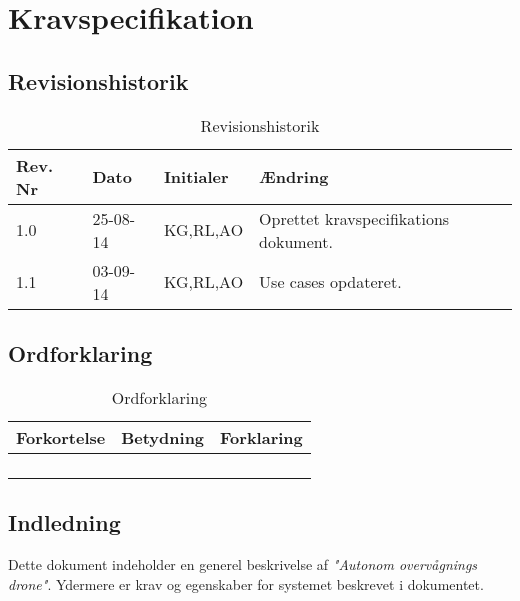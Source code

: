 \chapter{Kravspecifikation}

\section{Revisionshistorik}
\begin{table}[H]
	\centering
		\begin{tabular}{|p{2 cm}|p{2 cm}|p{3 cm}|p{6 cm}|} 
		\hline
			Rev. Nr & Dato		& Initialer 	& Ændring \\ \hline
			1.0 	& 25-08-14	& KG,RL,AO		& Oprettet kravspecifikations dokument.	\\ \hline
			1.1 	& 03-09-14	& KG,RL,AO		& Use cases opdateret.\\ \hline
		\end{tabular}
	\caption{Revisionshistorik}
\end{table}



\section{Ordforklaring}
\begin{table}[H]
	\centering
		\begin{tabular}{|p{4.5cm}|p{4.5 cm}|p{4.5 cm}|} 
		\hline
			Forkortelse & Betydning & Forklaring \\ \hline
			& & \\ \hline
			& & \\ \hline
			& & \\ \hline
			& & \\ \hline
		\end{tabular}
	\caption{Ordforklaring}
\end{table}

\vspace{4cm}

\section{Indledning}

Dette dokument indeholder en generel beskrivelse af \textit{"Autonom overvågnings drone"}. Ydermere er krav og egenskaber for systemet beskrevet i dokumentet.